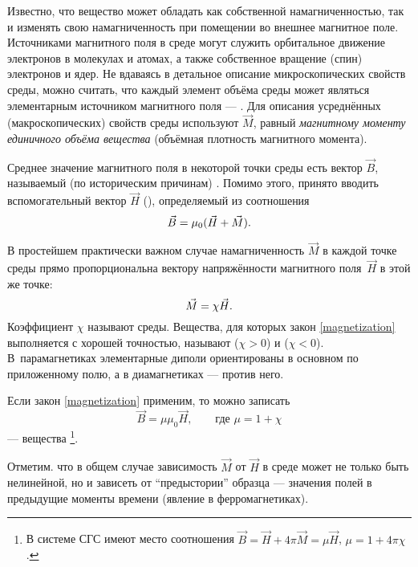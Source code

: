 Известно, что вещество может обладать как собственной намагниченностью, так
и изменять свою намагниченность при помещении во внешнее магнитное поле.
Источниками магнитного поля в среде могут служить орбитальное движение электронов
в молекулах и атомах, а также собственное вращение (спин) электронов и ядер.
Не вдаваясь в детальное описание микроскопических свойств среды, можно считать,
что каждый элемент объёма среды может являться элементарным источником
магнитного поля --- . Для описания усреднённых
(макроскопических) свойств среды используют
 $\vec{M}$, равный
\emph{магнитному моменту единичного объёма вещества} (объёмная плотность магнитного момента).

Среднее значение магнитного поля в некоторой точки среды есть вектор
$\vec{B}$, называемый (по историческим причинам) .
Помимо этого, принято вводить вспомогательный вектор $\vec{H}$
(), определяемый из соотношения
\begin{equation}
    \eqmark{fieldB}
    \vec{B} = \mu_0(\vec{H} + \vec{M}).
\end{equation}

В простейшем практически важном случае намагниченность $\vec{M}$ в каждой
точке среды прямо пропорциональна вектору напряжённости магнитного
поля~$\vec{H}$ в этой же точке:
\begin{equation}
    \eqmark{magnetization}
    \vec{M} = \chi\vec{H}.
\end{equation}
Коэффициент $\chi$ называют  среды.
Вещества, для которых закон \eqref{magnetization} выполняется
с хорошей точностью, называют  ($\chi > 0$) и
 ($\chi < 0$).
В~парамагнетиках элементарные диполи
ориентированы в основном по приложенному полю,
а в диамагнетиках --- против него.

Если закон \eqref{magnetization} применим,
то можно записать
\begin{equation}
    \vec{B} = \mu\mu_0 \vec{H},\qquad \text{где }\mu = 1 + \chi
\end{equation}
---  вещества%
\footnote{В системе СГС имеют место соотношения
    $\vec{B}=\vec{H}+4\pi\vec{M}=\mu\vec{H}$, $\mu = 1 + 4\pi \chi$.}.

Отметим. что в общем случае зависимость $\vec{M}$ от $\vec{H}$ в среде может
не только быть нелинейной, но и зависеть от ``предыстории'' образца ---
значения полей в предыдущие моменты времени
(явление  в ферромагнетиках).




